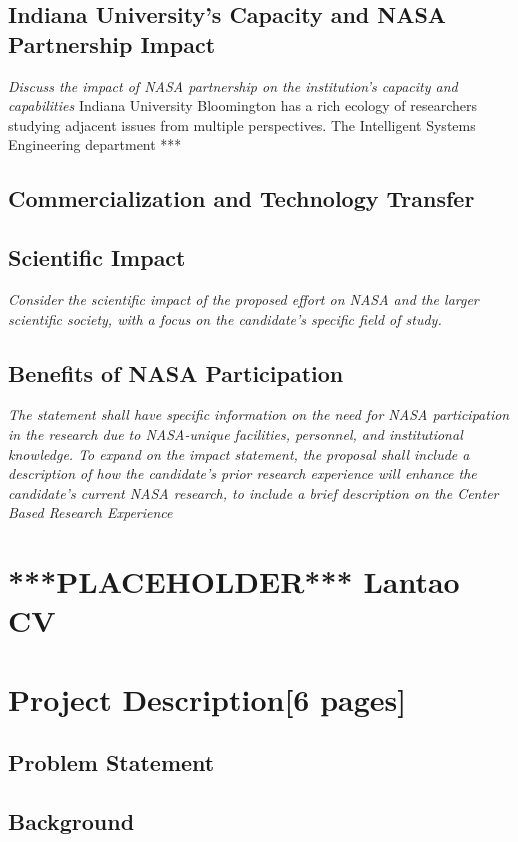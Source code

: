 \documentclass[12pt]{article}
\begin{document}
\subsection{Indiana University's Capacity and NASA Partnership Impact}
\textit{Discuss the impact of NASA partnership on the institution’s capacity and
capabilities}
Indiana University Bloomington has a rich ecology of researchers studying adjacent issues from multiple perspectives. The Intelligent Systems Engineering department ***

\subsection{Commercialization and Technology Transfer}

\subsection{Scientific Impact}
\textit{Consider the scientific impact of the proposed effort on NASA and the larger
scientific society, with a focus on the candidate’s specific field of study.}

\subsection{Benefits of NASA Participation}
\textit{The statement shall have specific information on the need for NASA participation in
the research due to NASA-unique facilities, personnel, and institutional knowledge.
To expand on the impact statement, the proposal shall include a description of how
the candidate’s prior research experience will enhance the candidate’s current
NASA research, to include a brief description on the Center Based Research
Experience}

\newpage
\section{ ***PLACEHOLDER*** Lantao CV }

\newpage
\section{Project Description[6 pages]}

\subsection{Problem Statement}
\subsection{Background}
\end{document}
